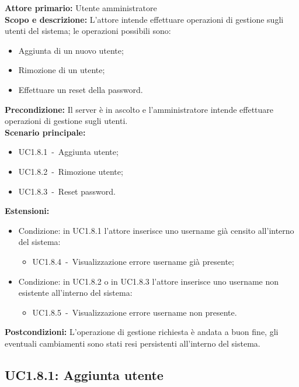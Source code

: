 \documentclass{scalatekids-article}
\begin{document}
\textbf{Attore primario:} Utente amministratore\\
\textbf{Scopo e descrizione:} L'attore intende effettuare operazioni di gestione sugli utenti del sistema; le operazioni possibili sono:
\begin{itemize}
\item Aggiunta di un nuovo utente;
\item Rimozione di un utente;
\item Effettuare un reset della password.
\end{itemize}
\textbf{Precondizione:} Il server è in ascolto e l'amministratore intende effettuare operazioni di gestione sugli utenti.\\
\textbf{Scenario principale:}
\begin{itemize}
\item UC1.8.1\ -\ Aggiunta utente;
\item UC1.8.2\ -\ Rimozione utente;
\item UC1.8.3\ -\ Reset password.
\end{itemize}
\textbf{Estensioni:}
\begin{itemize}
\item Condizione: in UC1.8.1 l'attore inserisce uno username già censito all'interno del sistema:
  \begin{itemize}
  \item UC1.8.4\ -\ Visualizzazione errore username già presente;
  \end{itemize}
\item Condizione: in UC1.8.2 o in UC1.8.3 l'attore inserisce uno username non esistente all'interno del sistema:
  \begin{itemize}
  \item UC1.8.5\ -\ Visualizzazione errore username non presente.
  \end{itemize}
\end{itemize}
\textbf{Postcondizioni:} L'operazione di gestione richiesta è andata a buon fine, gli eventuali cambiamenti sono stati resi persistenti all'interno del sistema.

\subsection{UC1.8.1: Aggiunta utente}
\end{document}
